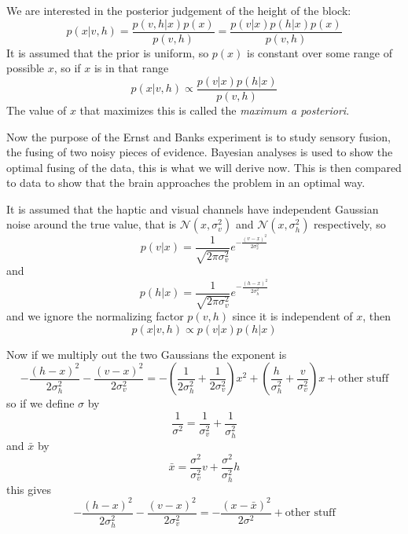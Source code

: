 \documentclass{article}
\begin{document}
We are interested in the posterior judgement of the height of the block:
\begin{equation}
p(x|v,h)=\frac{p(v,h|x)p(x)}{p(v,h)}=\frac{p(v|x)p(h|x)p(x)}{p(v,h)}
\end{equation}
It is assumed that the prior is uniform, so $p(x)$ is constant over some range of possible $x$, so if $x$ is in that range
\begin{equation}
p(x|v,h)\propto \frac{p(v|x)p(h|x)}{p(v,h)}
\end{equation}
The value of $x$ that maximizes this is called the \textsl{maximum a posteriori}.

Now the purpose of the Ernst and Banks experiment is to study sensory
fusion, the fusing of two noisy pieces of evidence. Bayesian analyses
is used to show the optimal fusing of the data, this is what we will
derive now. This is then compared to data to show that the brain
approaches the problem in an optimal way. 

It is assumed that the haptic and visual channels have independent
Gaussian noise around the true value, that is
$\mathcal{N}(x,\sigma_v^2)$ and $\mathcal{N}(x,\sigma_h^2)$
respectively, so
\begin{equation}
p(v|x)=\frac{1}{\sqrt{2\pi\sigma_v^2}}e^{-\frac{(v-x)^2}{2\sigma_v^2}}
\end{equation}
and 
\begin{equation}
p(h|x)=\frac{1}{\sqrt{2\pi\sigma_v^2}}e^{-\frac{(h-x)^2}{2\sigma_h^2}}
\end{equation}
and we ignore the normalizing factor $p(v,h)$ since it is independent of $x$, then
\begin{equation}
p(x|v,h)\propto p(v|x)p(h|x)
\end{equation}

Now if we multiply out the two Gaussians the exponent is
\begin{equation}
-\frac{(h-x)^2}{2\sigma_h^2}-\frac{(v-x)^2}{2\sigma_v^2}=-\left(\frac{1}{2\sigma_h^2}+\frac{1}{2\sigma_v^2}\right)x^2+\left(\frac{h}{\sigma_h^2}+\frac{v}{\sigma_v^2}\right)x+\mbox{other stuff}
\end{equation}
so if we define $\sigma$ by
\begin{equation}
\frac{1}{\sigma^2}=\frac{1}{\sigma_v^2}+\frac{1}{\sigma_h^2}
\end{equation}
and $\bar{x}$ by
\begin{equation}
\bar{x}=\frac{\sigma^2}{\sigma_v^2}v+\frac{\sigma^2}{\sigma_h^2}h
\end{equation}
this gives
\begin{equation}
-\frac{(h-x)^2}{2\sigma_h^2}-\frac{(v-x)^2}{2\sigma_v^2}=-\frac{(x-\bar{x})^2}{2\sigma^2}+\mbox{other stuff}
\end{equation}
\end{document}
